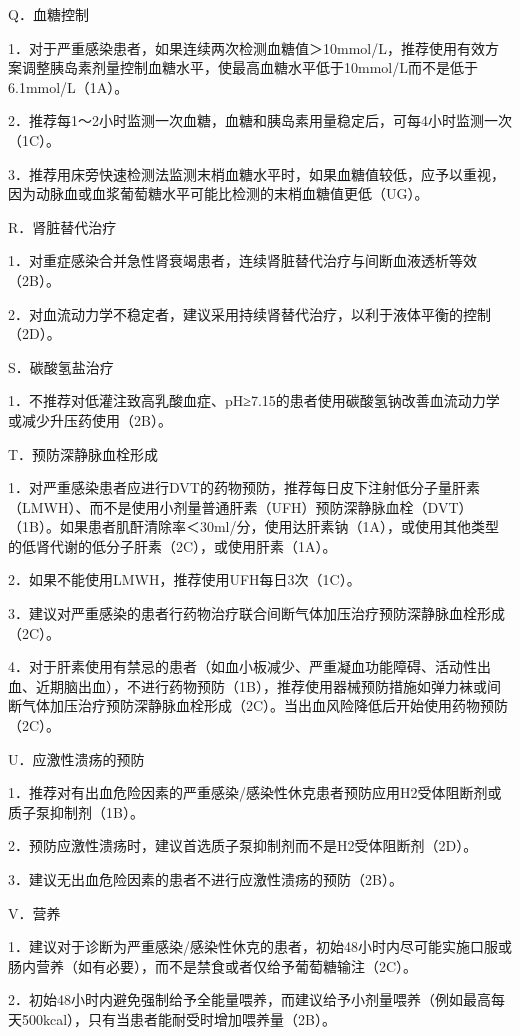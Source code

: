 Q．血糖控制

1．对于严重感染患者，如果连续两次检测血糖值＞10mmol/L，推荐使用有效方案调整胰岛素剂量控制血糖水平，使最高血糖水平低于10mmol/L而不是低于6.1mmol/L（1A）。

2．推荐每1～2小时监测一次血糖，血糖和胰岛素用量稳定后，可每4小时监测一次（1C）。

3．推荐用床旁快速检测法监测末梢血糖水平时，如果血糖值较低，应予以重视，因为动脉血或血浆葡萄糖水平可能比检测的末梢血糖值更低（UG）。

R．肾脏替代治疗

1．对重症感染合并急性肾衰竭患者，连续肾脏替代治疗与间断血液透析等效（2B）。

2．对血流动力学不稳定者，建议采用持续肾替代治疗，以利于液体平衡的控制（2D）。

S．碳酸氢盐治疗

1．不推荐对低灌注致高乳酸血症、pH≥7.15的患者使用碳酸氢钠改善血流动力学或减少升压药使用（2B）。

T．预防深静脉血栓形成

1．对严重感染患者应进行DVT的药物预防，推荐每日皮下注射低分子量肝素（LMWH）、而不是使用小剂量普通肝素（UFH）预防深静脉血栓（DVT）（1B）。如果患者肌酐清除率＜30ml/分，使用达肝素钠（1A），或使用其他类型的低肾代谢的低分子肝素（2C），或使用肝素（1A）。

2．如果不能使用LMWH，推荐使用UFH每日3次（1C）。

3．建议对严重感染的患者行药物治疗联合间断气体加压治疗预防深静脉血栓形成（2C）。

4．对于肝素使用有禁忌的患者（如血小板减少、严重凝血功能障碍、活动性出血、近期脑出血），不进行药物预防（1B），推荐使用器械预防措施如弹力袜或间断气体加压治疗预防深静脉血栓形成（2C）。当出血风险降低后开始使用药物预防（2C）。

U．应激性溃疡的预防

1．推荐对有出血危险因素的严重感染/感染性休克患者预防应用H2受体阻断剂或质子泵抑制剂（1B）。

2．预防应激性溃疡时，建议首选质子泵抑制剂而不是H2受体阻断剂（2D）。

3．建议无出血危险因素的患者不进行应激性溃疡的预防（2B）。

V．营养

1．建议对于诊断为严重感染/感染性休克的患者，初始48小时内尽可能实施口服或肠内营养（如有必要），而不是禁食或者仅给予葡萄糖输注（2C）。

2．初始48小时内避免强制给予全能量喂养，而建议给予小剂量喂养（例如最高每天500kcal），只有当患者能耐受时增加喂养量（2B）。

